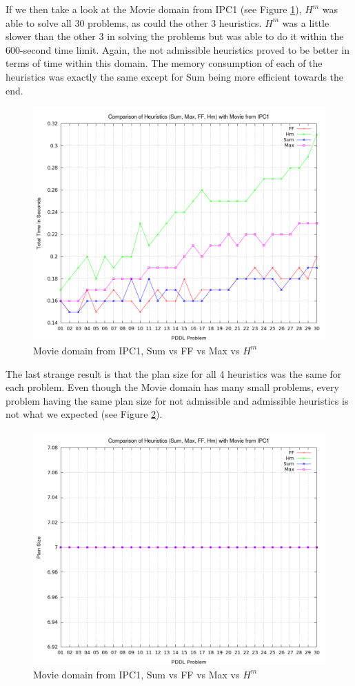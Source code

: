 If we then take a look at the Movie domain from IPC1 (see Figure \ref{fig:MovieTotalTimeHeuristics}), $H^m$ was able to solve all 30 problems, as could the other 3 heuristics. $H^m$ was a little slower than the other 3 in solving the problems but was able to do it within the 600-second time limit. Again, the not admissible heuristics proved to be better in terms of time within this domain. The memory consumption of each of the heuristics was exactly the same except for Sum being more efficient towards the end.
\begin{figure}[!htb]
    \centering
    \includegraphics[scale=0.35]{MovieTotalTime.png}
    \caption{Movie domain from IPC1, Sum vs FF vs Max vs $H^m$}
    \label{fig:MovieTotalTimeHeuristics}
\end{figure}
The last strange result is that the plan size for all 4 heuristics was the same for each problem. Even though the Movie domain has many small problems, every problem having the same plan size for not admissible and admissible heuristics is not what we expected (see Figure \ref{fig:MoviePlanSize}). 
\begin{figure}[!htb]
    \centering
    \includegraphics[scale=0.35]{MoviePlanSize.png}
    \caption{Movie domain from IPC1, Sum vs FF vs Max vs $H^m$}
    \label{fig:MoviePlanSize}
\end{figure}
